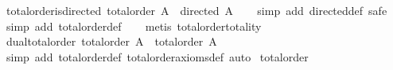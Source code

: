 \begin{isabellebody}
\isanewline
{}\isamarkupfalse%
\ total{}order{}is{}directed{}\ {}total{}order\ A\ {}\ directed\ A{}\isanewline
%
\isadelimproof
\ \ %
\endisadelimproof
%
\isatagproof
{}\isamarkupfalse%
\ {}simp\ add{}\ directed{}def{}\ safe{}\isanewline
\ \ \isamarkupfalse%
\ {}simp\ add{}\ total{}order{}def{}\isanewline
\ \ \isamarkupfalse%
\ {}metis\ total{}order{}totality{}%
\endisatagproof
{\isafoldproof}%
%
\isadelimproof
\isanewline
%
\endisadelimproof
\isanewline
{}\isamarkupfalse%
\ dual{}total{}order{}\ {}total{}order\ A\ {}\ total{}order\ {}A{}{}{}\isanewline
%
\isadelimproof
\ \ %
\endisadelimproof
%
\isatagproof
{}\isamarkupfalse%
\ {}simp\ add{}\ total{}order{}def\ total{}order{}axioms{}def{}\ auto{}%
\endisatagproof
{\isafoldproof}%
%
\isadelimproof
\isanewline
%
\endisadelimproof
\isanewline
{}\isamarkupfalse%
\ total{}order\isanewline
{}\isanewline
\isanewline
\ \ \isamarkupfalse%

\end{isabellebody}
